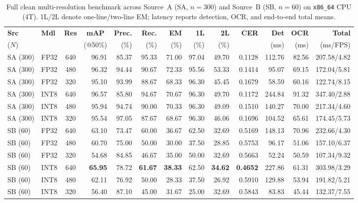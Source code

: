 \documentclass[pdflatex,sn-mathphys-num]{sn-jnl}
\begin{document}
\begin{table}[t]
\centering
\caption{Full clean multi-resolution benchmark across Source~A (SA, $n=300$) and Source~B (SB, $n=60$) on \texttt{x86\_64} CPU (4T). 1L/2L denote one-line/two-line EM; latency reports detection, OCR, and end-to-end total means.}\label{tab:clean_full}
{\fontsize{6.6pt}{8.0pt}\selectfont\setlength{\tabcolsep}{1.5pt}
\begin{tabular}{@{}llc@{\hspace{5pt}}rrrrrrrrrr@{}}
\toprule
\textbf{Src} & \textbf{Mdl} & \textbf{Res} & \multicolumn{1}{c}{\textbf{mAP}} & \textbf{Prec.} & \textbf{Rec.} & \textbf{EM} & \textbf{1L} & \textbf{2L} & \textbf{CER} & \textbf{Det} & \textbf{OCR} & \textbf{Total} \\
($N$) & & & \multicolumn{1}{c}{(@50\%)} & (\%) & (\%) & (\%) & (\%) & (\%) & & (ms) & (ms) & (ms/FPS) \\
\midrule
SA (300) & FP32 & 640 & 96.91 & 85.37 & 95.33 & 71.00 & 97.04 & 49.70 & 0.1128 & 112.76 & 82.56 & 207.58/4.82 \\
SA (300) & FP32 & 480 & 96.32 & 94.44 & 90.67 & 72.33 & 95.56 & 53.33 & 0.1414 & 95.07 & 69.15 & 172.04/5.81 \\
SA (300) & FP32 & 320 & 95.10 & 93.99 & 88.67 & 68.33 & 96.30 & 45.45 & 0.1679 & 58.59 & 60.16 & 122.74/8.15 \\
SA (300) & INT8 & 640 & 96.57 & 85.80 & 94.67 & 70.67 & 96.30 & 49.70 & 0.1172 & 244.84 & 91.32 & 347.40/2.88 \\
SA (300) & INT8 & 480 & 95.94 & 94.74 & 90.00 & 70.33 & 96.30 & 49.09 & 0.1510 & 140.27 & 70.00 & 217.34/4.60 \\
SA (300) & INT8 & 320 & 95.54 & 97.05 & 87.67 & 68.67 & 96.30 & 46.06 & 0.1696 & 104.52 & 65.61 & 174.45/5.73 \\
\midrule
SB (60) & FP32 & 640 & 63.10 & 73.47 & 60.00 & 36.67 & 62.50 & 32.69 & 0.5169 & 148.13 & 70.96 & 232.66/4.30 \\
SB (60) & FP32 & 480 & 60.70 & 75.00 & 50.00 & 30.00 & 37.50 & 28.85 & 0.5753 & 96.17 & 51.06 & 157.10/6.37 \\
SB (60) & FP32 & 320 & 54.68 & 84.85 & 46.67 & 35.00 & 50.00 & 32.69 & 0.5663 & 52.24 & 50.59 & 107.34/9.32 \\
SB (60) & INT8 & 640 & \textbf{65.95} & 78.72 & \textbf{61.67} & \textbf{38.33} & 62.50 & \textbf{34.62} & \textbf{0.4652} & 227.86 & 61.31 & 303.98/3.29 \\
SB (60) & INT8 & 480 & 62.11 & 76.92 & 50.00 & 28.33 & 37.50 & 26.92 & 0.5910 & 129.88 & 53.94 & 191.82/5.21 \\
SB (60) & INT8 & 320 & 56.40 & 87.10 & 45.00 & 31.67 & 25.00 & 32.69 & 0.5843 & 83.83 & 45.44 & 132.37/7.55 \\
\bottomrule
\end{tabular}%
}
\end{table}
\end{document}
